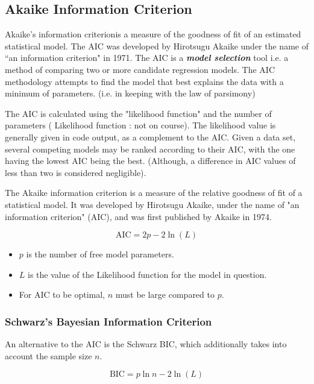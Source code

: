 \documentclass[a4paper,12pt]{article}
\begin{document}
\subsection{Akaike Information Criterion}


Akaike's information criterionis a measure of the goodness of fit of
an estimated statistical model. The AIC was developed by Hirotsugu Akaike under the name of ``an information criterion" in 1971. The AIC is a \textbf{\textit{model selection}} tool i.e. a method of comparing two
or more candidate regression models. The AIC methodology attempts to find the model that best explains the data with a minimum of parameters. (i.e. in keeping with the law of parsimony)

The AIC is calculated using the "likelihood function" and the number of parameters ( Likelihood function : not on course). The likelihood value is generally given in code output, as a complement to the AIC.
Given a data set, several competing models may be ranked according to their AIC, with the one having the lowest AIC being the best. (Although, a difference in AIC values of less than two is considered negligible).

The Akaike information criterion is a measure of the relative goodness of fit of a statistical model. It was developed by Hirotsugu Akaike, under the name of "an information criterion" (AIC), and was first published by Akaike in 1974.
\bigskip

\[\mbox{AIC} = 2p - 2\ln(L)\]

\begin{itemize}
	\item $p$ is the number of free model parameters.
	\item $L$ is the value of the Likelihood function for the model in question.
	\item For AIC to be optimal, $n$ must be large compared to $p$.\\
\end{itemize}
\subsubsection{Schwarz's Bayesian Information Criterion}
An alternative to the AIC is the Schwarz BIC, which additionally takes into account the sample size $n$.

\[\mbox{BIC} = p\ln{n} - 2\ln(L)\]
\end{document}
